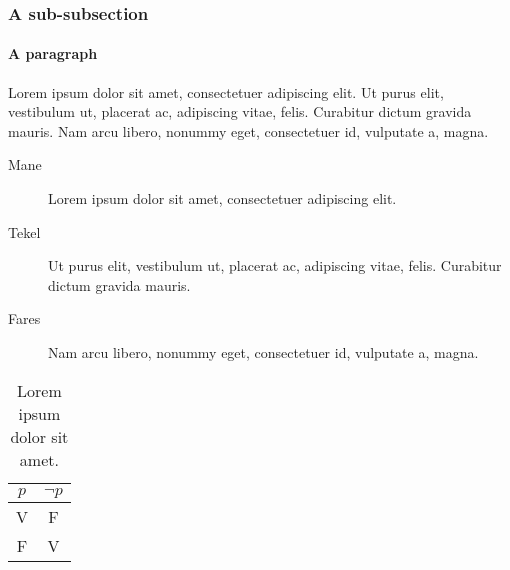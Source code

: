 \subsubsection*{A sub-subsection}
\lipsum[3]

\paragraph{A paragraph} Lorem ipsum dolor sit amet, consectetuer adipiscing elit. Ut purus elit, vestibulum ut, placerat ac, adipiscing vitae, felis. Curabitur dictum gravida mauris. Nam arcu libero, nonummy eget, consectetuer id, vulputate a, magna.

\bigskip

\lipsum[2]

\begin{description}
\item[Mane] Lorem ipsum dolor sit amet, consectetuer adipiscing elit.
\item[Tekel] Ut purus elit, vestibulum ut, placerat ac, adipiscing vitae, felis. Curabitur dictum gravida mauris.
\item[Fares] Nam arcu libero, nonummy eget, consectetuer
id, vulputate a, magna.
\end{description}

\begin{table}
\caption[Lorem ipsum dolor.]{Lorem ipsum dolor sit amet.}
\centering
\begin{tabular}{cc}
\toprule
$p$ & $\lnot p$ \\
\midrule
V   & F \\
F   & V \\
\bottomrule
\end{tabular}
\end{table}

\lipsum[1]




